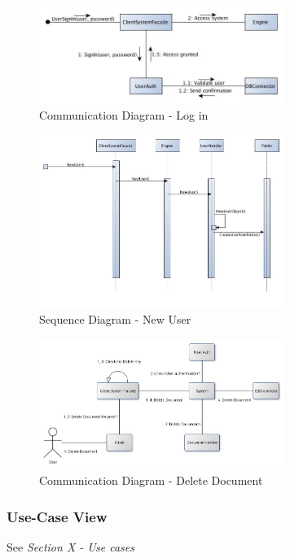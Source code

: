 \documentclass[11pt]{article}
\begin{document}
\begin{figure}[H]
  		\centering
    	\includegraphics[width=300px]{images/SAD/CommunicationDiagram_LogIn.jpg}
    	\caption{Communication Diagram - Log in}
\end{figure}

\begin{figure}[H]
  		\centering
    	\includegraphics[width=300px]{images/SAD/SSQ_NewUser.jpg}
    	\caption{Sequence Diagram - New User}
\end{figure}

\begin{figure}[H]
  		\centering
    	\includegraphics[width=300px]{images/CommunicationDiagrams/Delete Communication Diagram.jpg}
    	\caption{Communication Diagram - Delete Document}
\end{figure}

\subsubsection{Use-Case View}
\label{sec-4-1-7}

See \emph{Section X - Use cases}
\end{document}
